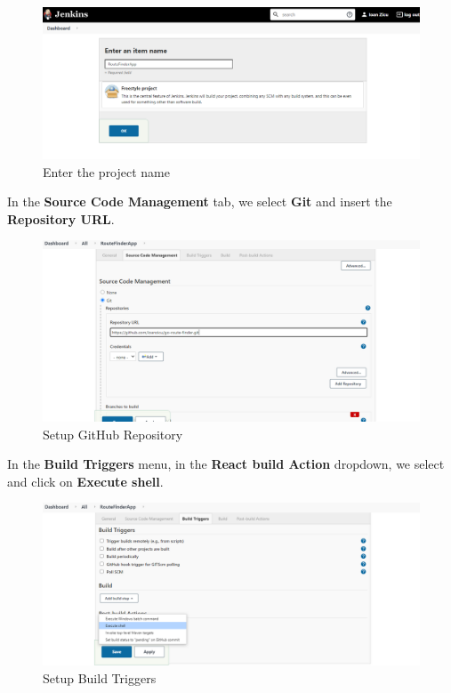 \documentclass[12pt,a4paper,twoside]{article}
\begin{document}
\begin{figure}[H]
    \centering
        \includegraphics[width=15cm]{images-aws/33-jenkins-set-project-name.png}
        \caption{Enter the project name}
\end{figure}


In the \textbf{Source Code Management} tab, we select \textbf{Git} and insert the \textbf{Repository URL}.


\begin{figure}[H]
    \centering
        \includegraphics[width=15cm]{images-aws/34-jenkins-setup-repo-no-error.png}
        \caption{Setup GitHub Repository}
\end{figure}


In the \textbf{Build Triggers} menu, in the \textbf{React build Action} dropdown, we select and click on \textbf{Execute shell}.


\begin{figure}[H]
    \centering
        \includegraphics[width=15cm]{images-aws/35-jenkins-build-setup.png}
        \caption{Setup Build Triggers}
\end{figure}
\end{document}

